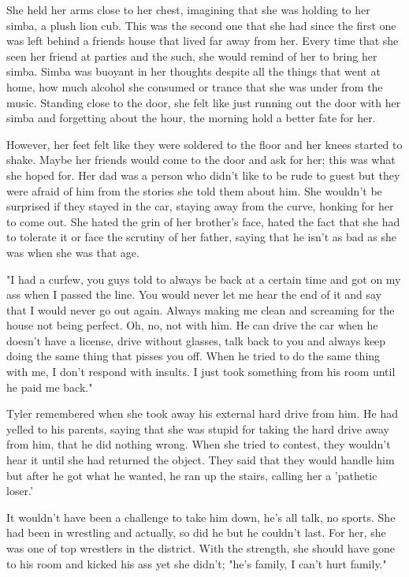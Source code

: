 \begin{Document}
        She held her arms close to her chest, imagining that she was holding to her simba, a plush lion cub. This was the second one that she had since
    the first one was left behind a friends house that lived far away from her. Every time that she seen her friend at parties and the such, she would
    remind of her to bring her simba. Simba was buoyant in her thoughts despite all the things that went at home, how much alcohol she consumed or
    trance that she was under from the music. Standing close to the door, she felt like just running out the door with her simba and forgetting about
    the hour, the morning hold a better fate for her.

        However, her feet felt like they were soldered to the floor and her knees started to shake. Maybe her friends would come to the door and ask for
    her; this was what she hoped for. Her dad was a person who didn't like to be rude to guest but they were afraid of him from the stories she told them
    about him. She wouldn't be surprised if they stayed in the car, staying away from the curve, honking for her to come out. She hated the grin of her
    brother's face, hated the fact that she had to tolerate it or face the scrutiny of her father, saying that he isn't as bad as she was when she was
    that age.

        "I had a curfew, you guys told to always be back at a certain time and got on my ass when I passed the line. You would never let me hear the end
    of it and say that I would never go out again. Always making me clean and screaming for the house not being perfect. Oh, no, not with him. He can drive
    the car when he doesn't have a license, drive without glasses, talk back to you and always keep doing the same thing that pisses you off. When he
    tried to do the same thing with me, I don't respond with insults. I just took something from his room until he paid me back."

        Tyler remembered when she took away his external hard drive from him. He had yelled to his parents, saying that she was stupid for taking the
    hard drive away from him, that he did nothing wrong. When she tried to contest, they wouldn't hear it until she had returned the object. They said
    that they would handle him but after he got what he wanted, he ran up the stairs, calling her a 'pathetic loser.'

        It wouldn't have been a challenge to take him down, he's all talk, no sports. She had been in wrestling and actually, so did he but he couldn't
    last. For her, she was one of top wrestlers in the district. With the strength, she should have gone to his room and kicked his ass yet she didn't;
    "he's family, I can't hurt family."


\end{Document}
